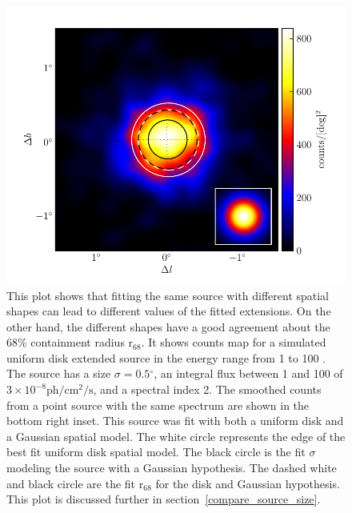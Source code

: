 \documentclass[12pt,preprint]{aastex}
\newcommand{\gev}{\text{GeV}\xspace}
\newcommand{\ph}{\text{ph}\xspace}
\newcommand{\cm}{\text{cm}\xspace}
\renewcommand{\sec}{\text{s}\xspace}
\newcommand{\rsixeight}{{\ensuremath{\text{r}_{68}}}\xspace}
\renewcommand{\deg}{\ensuremath{^\circ}\xspace}
\begin{document}
  \begin{figure}
    \begin{center}
      \includegraphics{mc_plots/compare_r68.pdf}
      \end{center}
      \caption{
      This plot shows that fitting the same source with different
      spatial shapes can lead to different values of the fitted
      extensions. On the other hand, the different shapes have a
      good agreement about the 68\% containment radius \rsixeight.
      It shows counts map for a simulated uniform disk extended source
      in the energy range from 1 \gev to 100 \gev.  The source has a
      size $\sigma=0.5\deg$, an integral flux between 1 \gev and 100
      \gev of $3\times 10^{-8}\ph/\cm^2/\sec$, and a spectral index 2.
      The smoothed counts from a point source with the same spectrum are
      shown in the bottom right inset.  This source was fit with both
      a uniform disk and a Gaussian spatial model.  The white circle
      represents the edge of the best fit uniform disk spatial model.
      The black circle is the fit $\sigma$ modeling the source with a
      Gaussian hypothesis.  The dashed white and black circle are the
      fit \rsixeight for the disk and Gaussian hypothesis. This plot is
      discussed further in section~\ref{compare_source_size}.
      }\label{compare_r68}
    \end{figure}
\end{document}
